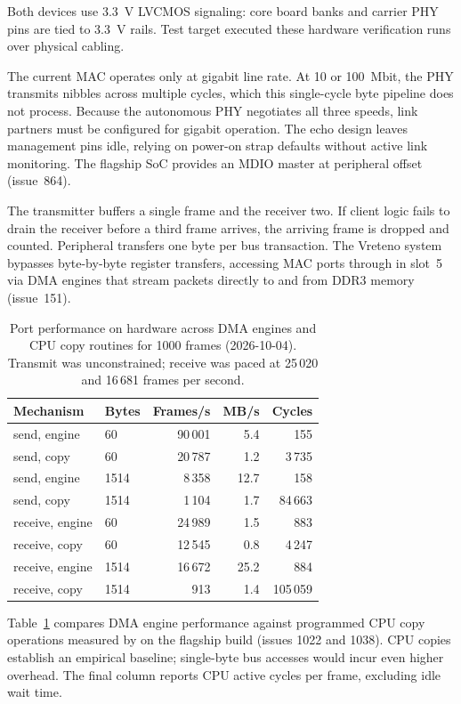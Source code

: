 \documentclass[journal,9pt]{IEEEtran}
\begin{document}
Both devices use 3.3~V LVCMOS signaling: core board banks and carrier
PHY pins are tied to 3.3~V rails. Test target 
executed these hardware verification runs over physical cabling.

The current MAC operates only at gigabit line rate. At 10 or 100~Mbit, the
PHY transmits nibbles across multiple cycles, which this single-cycle byte
pipeline does not process. Because the autonomous PHY negotiates all three
speeds, link partners must be configured for gigabit operation. The echo
design leaves management pins idle, relying on power-on strap defaults
without active link monitoring. The flagship SoC provides an MDIO master
at peripheral offset  (issue~864).

The transmitter buffers a single frame and the receiver two. If client
logic fails to drain the receiver before a third frame arrives, the
arriving frame is dropped and counted.
Peripheral  transfers one byte per bus transaction. The
Vreteno system bypasses byte-by-byte register transfers, accessing MAC
ports through  in slot~5 via DMA engines that stream
packets directly to and from DDR3 memory (issue~151).

\begin{table}[htbp]
\caption{Port performance on hardware across DMA engines and CPU copy routines
for 1000 frames (2026-10-04). Transmit was unconstrained; receive was paced
at 25\,020 and 16\,681 frames per second.}
\label{tab:e-perf}
\centering
\begin{tabular}{@{}llrrr@{}}
\toprule
Mechanism & Bytes & Frames/s & MB/s & Cycles \\
\midrule
send, engine & 60 & 90\,001 & 5.4 & 155 \\
send, copy & 60 & 20\,787 & 1.2 & 3\,735 \\
send, engine & 1514 & 8\,358 & 12.7 & 158 \\
send, copy & 1514 & 1\,104 & 1.7 & 84\,663 \\
receive, engine & 60 & 24\,989 & 1.5 & 883 \\
receive, copy & 60 & 12\,545 & 0.8 & 4\,247 \\
receive, engine & 1514 & 16\,672 & 25.2 & 884 \\
receive, copy & 1514 & 913 & 1.4 & 105\,059 \\
\bottomrule
\end{tabular}
\end{table}

Table~\ref{tab:e-perf} compares DMA engine performance against programmed CPU
copy operations measured by  on the flagship build
(issues 1022 and 1038). CPU copies establish an empirical baseline; single-byte
 bus accesses would incur even higher overhead. The final
column reports CPU active cycles per frame, excluding idle wait time.
\end{document}
